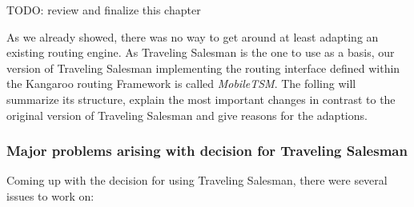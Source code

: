 TODO: review and finalize this chapter\newline

As we already showed, there was no way to get around at least adapting an existing routing engine. As Traveling Salesman is the one to use as a basis, our version of Traveling Salesman implementing the routing interface defined within the Kangaroo routing Framework is called \emph{MobileTSM}. The folling will summarize its structure, explain the most important changes in contrast to the original version of Traveling Salesman and give reasons for the adaptions.

\subsubsection{Major problems arising with decision for Traveling Salesman}

Coming up with the decision for using Traveling Salesman, there were several issues to work on:


